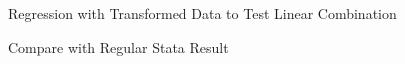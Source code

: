 Regression with Transformed Data to Test Linear Combination
\begin{stlog}\end{stlog}
Compare with Regular Stata Result
\begin{stlog}\end{stlog}
